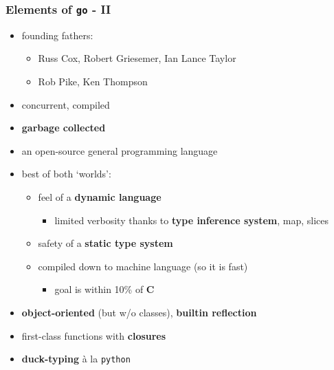 \documentclass[bigger]{beamer}
\providecommand{\alert}[1]{\textbf{#1}}
\begin{document}
\begin{frame}
\frametitle{Elements of \verb~go~ - II}
\label{sec-1-9}


\begin{itemize}
\item founding fathers:
\begin{itemize}
\item Russ Cox, Robert Griesemer, Ian Lance Taylor
\item Rob Pike, Ken Thompson
\end{itemize}
\item concurrent, compiled
\item \alert{garbage collected}
\item an open-source general programming language
\item best of both `worlds':
\begin{itemize}
\item feel of a \alert{dynamic language}
\begin{itemize}
\item limited verbosity thanks to \textbf{type inference system}, map, slices
\end{itemize}
\item safety of a \alert{static type system}
\item compiled down to machine language (so it is fast)
\begin{itemize}
\item goal is within 10\% of \alert{C}
\end{itemize}
\end{itemize}
\item \alert{object-oriented} (but w/o classes), \alert{builtin reflection}
\item first-class functions with \alert{closures}
\item \alert{duck-typing} \`a la \verb~python~
\end{itemize}
\end{frame}
\end{document}
